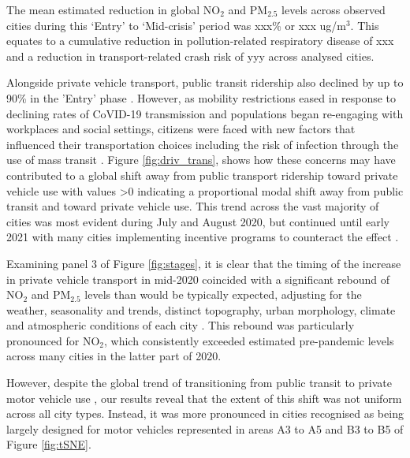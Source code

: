 \documentclass[preprint,12pt]{elsarticle}
\begin{document}
The mean estimated reduction in global NO$_{2}$ and PM$_{2.5}$ levels across observed cities during this `Entry' to `Mid-crisis' period was xxx\% or xxx ug/m$^{3}$. This equates to a cumulative reduction in pollution-related respiratory disease of xxx and a reduction in transport-related crash risk of yyy across analysed cities.

Alongside private vehicle transport, public transit ridership also declined by up to 90\% in the 'Entry' phase \cite{TransitCovid_Gkiotsalitis}. However, as mobility restrictions eased in response to declining rates of CoVID-19 transmission and populations began re-engaging with workplaces and social settings, citizens were faced with new factors that influenced their transportation choices including the risk of infection through the use of mass transit \cite{BECKTransit}. Figure \ref{fig:driv_trans}, shows how these concerns may have contributed to a global shift away from public transport ridership toward private vehicle use with values \textgreater 0 indicating a proportional modal shift away from public transit and toward private vehicle use. This trend across the vast majority of cities was most evident during July and August 2020, but continued until early 2021 with many cities implementing incentive programs to counteract the effect \cite{dai2021improving}.

Examining panel 3 of Figure \ref{fig:stages}, it is clear that the timing of the increase in private vehicle transport in mid-2020 coincided with a significant rebound of NO$_{2}$ and PM$_{2.5}$ levels than would be typically expected, adjusting for the weather, seasonality and trends, distinct topography, urban morphology, climate and atmospheric conditions of each city \cite{Wijnands2022}. This rebound was particularly pronounced for NO$_{2}$, which consistently exceeded estimated pre-pandemic levels across many cities in the latter part of 2020.

However, despite the global trend of transitioning from public transit to private motor vehicle use \cite{fernando2023shaping}, our results reveal that the extent of this shift was not uniform across all city types. Instead, it was more pronounced in cities recognised as being largely designed for motor vehicles \cite{Thompson2020} represented in areas A3 to A5 and B3 to B5 of Figure \ref{fig:tSNE}.
\end{document}
